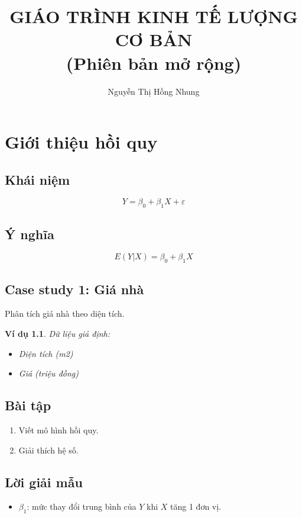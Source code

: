\documentclass[12pt,a4paper]{book}
\title{GIÁO TRÌNH KINH TẾ LƯỢNG CƠ BẢN\\
(Phiên bản mở rộng)}
\author{Nguyễn Thị Hồng Nhung}
\date{}
\newtheorem{example}{Ví dụ}
\begin{document}
\maketitle
\tableofcontents

\chapter{Giới thiệu hồi quy}

\section{Khái niệm}
\[
Y = \beta_0 + \beta_1 X + \varepsilon
\]

\section{Ý nghĩa}
\[
E(Y|X) = \beta_0 + \beta_1 X
\]

\section{Case study 1: Giá nhà}
Phân tích giá nhà theo diện tích.

\begin{example}
Dữ liệu giả định:
\begin{itemize}
\item Diện tích (m2)
\item Giá (triệu đồng)
\end{itemize}
\end{example}

\section{Bài tập}
\begin{enumerate}
\item Viết mô hình hồi quy.
\item Giải thích hệ số.
\end{enumerate}

\section{Lời giải mẫu}
\begin{itemize}
\item $\beta_1$: mức thay đổi trung bình của $Y$ khi $X$ tăng 1 đơn vị.
\end{itemize}
\end{document}
